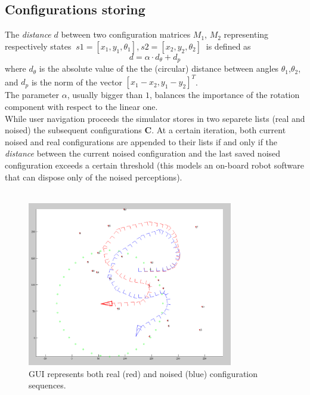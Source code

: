 \subsection{Configurations storing}
The \textit{distance} $d$ between two configuration matrices $M_1$, $M_2$ representing respectively states $~ s1 = [x_1,y_1,\theta_1]$,$~ s2 = [x_2,y_2,\theta_2]~$
is defined as
\[ 
d = \alpha \cdot d_{\theta} + d_p
\]
where $d_{\theta}$ is the absolute value of the the (circular) distance between angles $\theta_1$,$\theta_2$,
and $d_p$ is the norm of the vector $[x_1 - x_2,y_1 - y_2]^T$.\\
The parameter $\alpha$, usually bigger than $1$, balances the importance of the rotation component with respect to the linear one.\\
While user navigation proceeds the simulator stores in two separete lists (real and noised) the subsequent configurations $\textbf{C}$.
At a certain iteration, both current noised and real configurations are appended to their lists if and only if the \textit{distance} between the current noised configuration 
and the last saved noised configuration exceeds a certain threshold (this models an on-board robot software that can dispose only of the noised perceptions).\\
\\
\begin{figure}[htbp]
  \centering
    \includegraphics[width=0.8\textwidth]{images/matlab_simulator.png}
  \caption{GUI represents both real (red) and noised (blue) configuration sequences.}
  \label{fig:matlab_simulator}
\end{figure}


